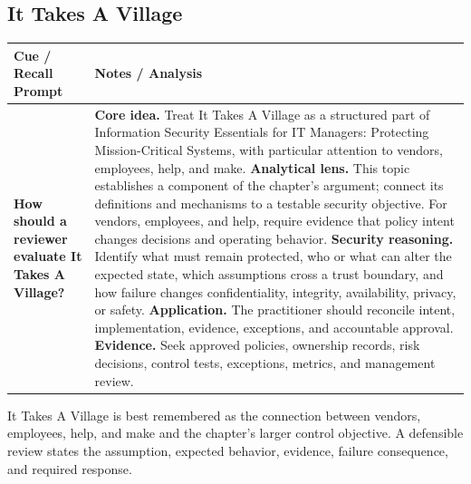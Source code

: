 \documentclass[11pt]{article}
\newcommand{\CornellHeader}{%
\rowcolor{Navy}\color{white}\bfseries Cue / Recall Prompt & \color{white}\bfseries Notes / Analysis\\\hline}
\newcommand{\CornellRow}[2]{%
\cellcolor{CueGray}\RaggedRight\textbf{#1} & \RaggedRight #2\\\hline}
\begin{document}
\subsection*{It Takes A Village}
\begin{longtable}{>{\RaggedRight\arraybackslash}p{}|>{\RaggedRight\arraybackslash}p{}}
\CornellHeader
\CornellRow{How should a reviewer evaluate It Takes A Village?}{\textbf{Core idea.} Treat It Takes A Village as a structured part of Information Security Essentials for IT Managers: Protecting Mission-Critical Systems, with particular attention to vendors, employees, help, and make. \textbf{Analytical lens.} This topic establishes a component of the chapter's argument; connect its definitions and mechanisms to a testable security objective. For vendors, employees, and help, require evidence that policy intent changes decisions and operating behavior. \textbf{Security reasoning.} Identify what must remain protected, who or what can alter the expected state, which assumptions cross a trust boundary, and how failure changes confidentiality, integrity, availability, privacy, or safety. \textbf{Application.} The practitioner should reconcile intent, implementation, evidence, exceptions, and accountable approval. \textbf{Evidence.} Seek approved policies, ownership records, risk decisions, control tests, exceptions, metrics, and management review.}
\end{longtable}
\begin{topicsummary}
It Takes A Village is best remembered as the connection between vendors, employees, help, and make and the chapter's larger control objective. A defensible review states the assumption, expected behavior, evidence, failure consequence, and required response.
\end{topicsummary}
\end{document}

